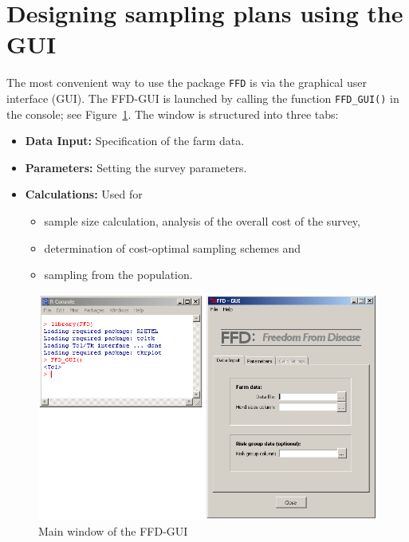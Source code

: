 \documentclass[nojss]{jss}
\begin{document}
\clearpage

\section{Designing sampling plans using the GUI} \label{sec:using-ffd-GUI}

The most convenient way to use the package \texttt{FFD} is via the   graphical user interface (GUI). The FFD-GUI is launched by calling the function \verb+FFD_GUI()+   in the  console; see Figure~\ref{fig:GUI_reset}. The window is structured into three tabs:

\begin{itemize}
\item \textbf{Data Input:} Specification of the farm data.
\item \textbf{Parameters:} Setting the survey parameters.
\item \textbf{Calculations:} Used for
    \begin{itemize}
    \item sample size calculation, analysis of the overall cost of the survey,
    \item determination of cost-optimal sampling schemes and
    \item sampling from the population.
    \end{itemize}
\end{itemize}


\begin{figure}[h!t]
\begin{center}
\includegraphics[width=120mm]{GUI_reset.png}
\end{center}
\caption{Main window of the FFD-GUI}
\label{fig:GUI_reset}
\end{figure}
\end{document}
